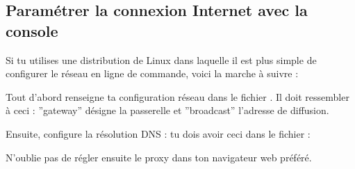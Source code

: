 \subsection{Param\'etrer la connexion Internet avec la console}
\label{linux_cmdline}
Si tu utilises une distribution de Linux dans laquelle il est plus simple de configurer le r\'eseau en ligne de commande, voici la marche \`a suivre :

Tout d'abord renseigne ta configuration r\'eseau dans le fichier . Il doit ressembler \`a ceci :
\noindent {}
''gateway'' d\'esigne la passerelle et ''broadcast'' l'adresse de diffusion.
\newline

Ensuite, configure la r\'esolution DNS : tu dois avoir ceci dans le fichier  :
\noindent {}

N'oublie pas de r\'egler ensuite le proxy dans ton navigateur web pr\'ef\'er\'e.